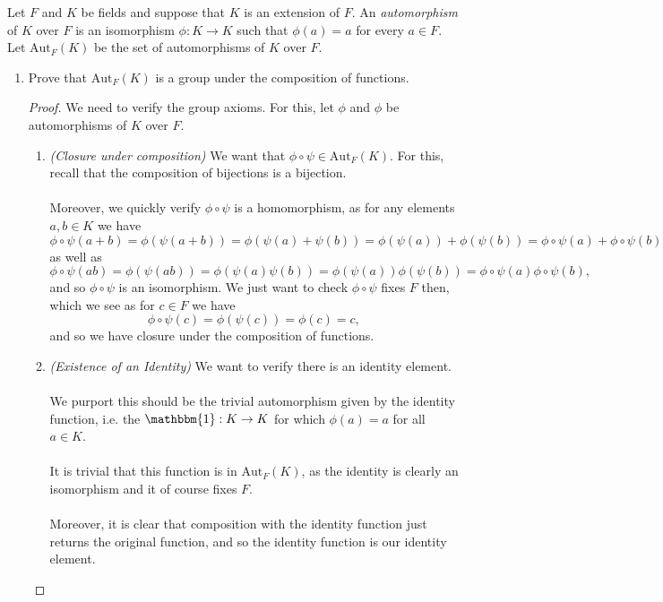 \documentclass[12pt]{article}
\newenvironment{ex}[2][Exercise]{\begin{trivlist}
\item[\hskip \labelsep {\bfseries #1}\hskip \labelsep {\bfseries #2.}]}{\end{trivlist}}
\begin{document}
\begin{ex}{4}
    Let $F$ and $K$ be fields and suppose that $K$ is an extension of $F$. An \textit{automorphism} of $K$ over $F$ is an isomorphism $\phi : K \rightarrow K$ such that $\phi(a) = a$ for every $a \in F$. Let $\text{Aut}_F(K)$ be the set of automorphisms of $K$ over $F$.
    \begin{enumerate}[label=(\alph*)]
        \item Prove that $\text{Aut}_F(K)$ is a group under the composition of functions.
        \begin{proof}
            We need to verify the group axioms. For this, let $\phi$ and $\phi$ be automorphisms of $K$ over $F$.
            \begin{enumerate}[label=(\roman*)]
                \item \textit{(Closure under composition)}
                We want that $\phi \circ \psi \in \text{Aut}_F(K)$. For this, recall that the composition of bijections is a bijection. \\ \\
                Moreover, we quickly verify $\phi \circ \psi$ is a homomorphism, as for any elements $a, b \in K$ we have
                $$\phi \circ \psi(a + b) = \phi(\psi(a + b)) = \phi(\psi(a) + \psi(b)) = \phi(\psi(a)) + \phi(\psi(b)) = \phi \circ \psi(a) + \phi \circ \psi(b)$$
                as well as
                $$\phi \circ \psi(ab) = \phi(\psi(ab)) = \phi(\psi(a)\psi(b)) = \phi(\psi(a))\phi(\psi(b)) = \phi \circ \psi(a)\phi \circ \psi(b),$$
                and so $\phi \circ \psi$ is an isomorphism. We just want to check $\phi \circ \psi$ fixes $F$ then, which we see as for $c \in F$ we have
                $$\phi\circ\psi(c) = \phi(\psi(c)) = \phi(c) = c,$$
                and so we have closure under the composition of functions.
                \item \textit{(Existence of an Identity)} We want to verify there is an identity element. \\ \\ We purport this should be the trivial automorphism given by the identity function, i.e. the $\mathbbm{1} : K \rightarrow K$ for which $\phi(a) = a$ for all $a \in K$. \\ \\
                It is trivial that this function is in $\text{Aut}_F(K)$, as the identity is clearly an isomorphism and it of course fixes $F$. \\ \\
                Moreover, it is clear that composition with the identity function just returns the original function, and so the identity function is our identity element.

\end{enumerate}
\end{proof}
\end{enumerate}
\end{ex}
\end{document}

